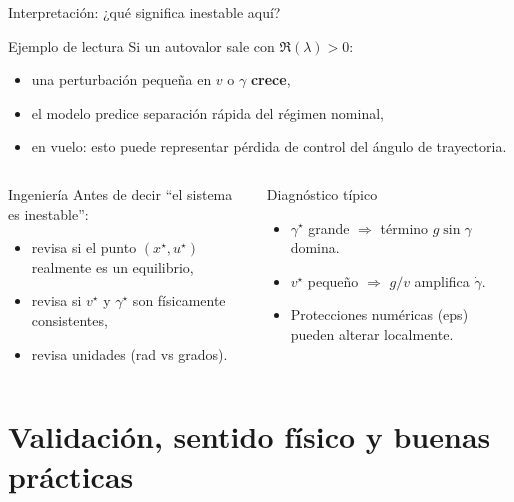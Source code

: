 \documentclass[aspectratio=169,10pt]{beamer}
\newcommand{\importantbox}[2][Importante]{%
\begin{alertblock}{#1}#2\end{alertblock}}
\begin{document}
\begin{frame}{Interpretación: ¿qué significa inestable aquí?}
\small

\begin{block}{Ejemplo de lectura}
Si un autovalor sale con $\Re(\lambda)>0$:
\begin{itemize}
\item una perturbación pequeña en $v$ o $\gamma$ \textbf{crece},
\item el modelo predice separación rápida del régimen nominal,
\item en vuelo: esto puede representar pérdida de control del ángulo de trayectoria.
\end{itemize}
\end{block}

\begin{columns}[T]
\importantbox[Ingeniería]{
Antes de decir ``el sistema es inestable'':
\begin{itemize}
\item revisa si el punto $(x^\star,u^\star)$ realmente es un equilibrio,
\item revisa si $v^\star$ y $\gamma^\star$ son físicamente consistentes,
\item revisa unidades (rad vs grados).
\end{itemize}
}

\begin{block}{Diagnóstico típico}
\begin{itemize}
\item $\gamma^\star$ grande $\Rightarrow$ término $g\sin\gamma$ domina.
\item $v^\star$ pequeño $\Rightarrow$ $g/v$ amplifica $\dot{\gamma}$.
\item Protecciones numéricas (eps) pueden alterar localmente.
\end{itemize}
\end{block}
\end{columns}

\end{frame}

\section{Validación, sentido físico y buenas prácticas}
\end{document}
